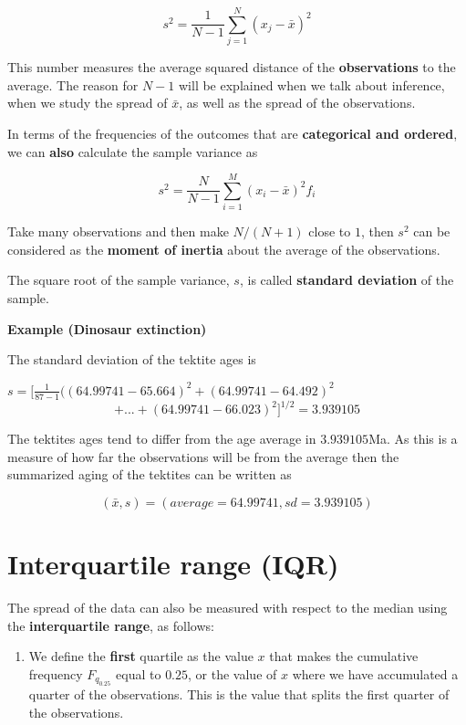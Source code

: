 \documentclass[
]{book}
\providecommand{\tightlist}{%
  \setlength{\itemsep}{0pt}\setlength{\parskip}{0pt}}
\begin{document}
\[s^2=\frac{ 1}{ N-1} \sum_{j=1}^N ( x_j -\bar{x})^2\]

This number measures the average squared distance of the \textbf{observations} to the average. The reason for \(N-1\) will be explained when we talk about inference, when we study the spread of \(\bar{x}\), as well as the spread of the observations.

In terms of the frequencies of the outcomes that are \textbf{categorical and ordered}, we can \textbf{also} calculate the sample variance as

\[s^2=\frac{N}{N-1} \sum_{i=1}^M (x_i -\bar{x})^2 f_i\]

Take many observations and then make \(N/(N+1)\) close to \(1\), then \(s^2\) can be considered as the \textbf{moment of inertia} about the average of the observations.

The square root of the sample variance, \(s\), is called \textbf{standard deviation} of the sample.

\textbf{Example (Dinosaur extinction)}

The standard deviation of the tektite ages is

\(s= [\frac{ 1}{87-1}((64.99741-65.664)^2+ (64.99741-64.492)^2\)
\[+ ... + (64.99741-66.023)^ 2]^{1/2} = 3.939105\]

The tektites ages tend to differ from the age average in \(3.939105\)Ma. As this is a measure of how far the observations will be from the average then the summarized aging of the tektites can be written as

\[(\bar{x}, s)= (average=64.99741, sd= 3.939105)\]

\hypertarget{interquartile-range-iqr}{%
\section{Interquartile range (IQR)}\label{interquartile-range-iqr}}

The spread of the data can also be measured with respect to the median using the \textbf{interquartile range}, as follows:

\begin{enumerate}
\def\labelenumi{\arabic{enumi})}
\tightlist
\item
  We define the \textbf{first} quartile as the value \(x\) that makes the cumulative frequency \(F_{q_{0.25}}\) equal to \(0.25\), or the value of \(x\) where we have accumulated a quarter of the observations. This is the value that splits the first quarter of the observations.
\end{enumerate}
\end{document}
